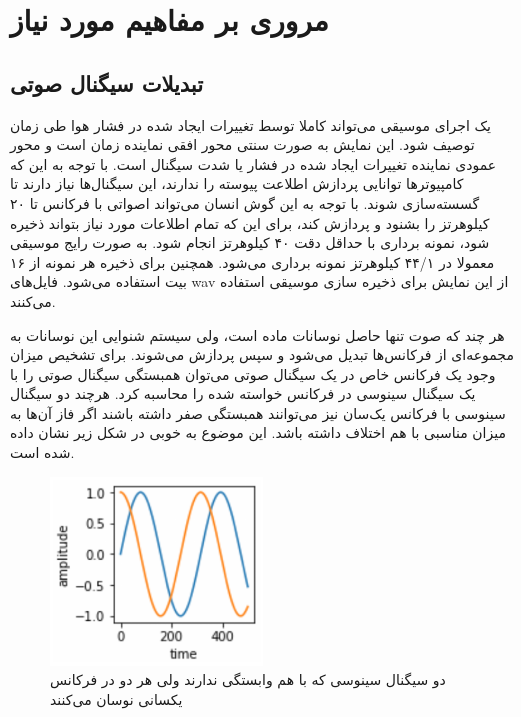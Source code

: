 \chapter{مروری بر مفاهیم مورد نیاز}
\section{تبدیلات سیگنال صوتی}
یک اجرای موسیقی می‌تواند کاملا توسط تغییرات ایجاد شده در فشار هوا طی زمان توصیف
شود. این نمایش به صورت سنتی محور افقی نماینده زمان است و محور عمودی نماینده
تغییرات ایجاد شده در فشار یا شدت سیگنال است. با توجه به این که کامپیوترها
توانایی پردازش اطلاعت پیوسته را ندارند، این سیگنال‌ها نیاز دارند تا گسسته‌سازی
شوند. با توجه به این گوش انسان می‌تواند اصواتی با فرکانس تا ۲۰ کیلوهرتز را بشنود
و پردازش کند، برای این که تمام اطلاعات مورد نیاز بتواند ذخیره شود، نمونه برداری
با حداقل دقت ۴۰ کیلوهرتز انجام شود. به صورت رایج موسیقی معمولا در ۴۴/۱ کیلوهرتز
نمونه برداری می‌شود. همچنین برای ذخیره هر نمونه از ۱۶ بیت استفاده می‌شود.
فایل‌های wav از این نمایش برای ذخیره سازی موسیقی استفاده می‌کنند.

هر چند که صوت تنها حاصل نوسانات ماده است، ولی سیستم شنوایی این نوسانات به
مجموعه‌ای از فرکانس‌ها تبدیل می‌شود و سپس پردازش می‌شوند. برای تشخیص میزان وجود
یک فرکانس خاص در یک سیگنال صوتی می‌توان همبستگی سیگنال صوتی را با یک سیگنال
سینوسی در فرکانس خواسته شده را محاسبه کرد. هرچند دو سیگنال سینوسی با فرکانس
یک‌سان نیز می‌توانند همبستگی صفر داشته باشند اگر فاز آن‌ها به میزان مناسبی با هم
اختلاف داشته باشد. این موضوع به خوبی در شکل زیر نشان داده شده است.
\begin{figure}[ht]
    \centering
    \includegraphics[height=5cm]{./statics/uncorrelated_sine_waves.png}
    \caption{دو سیگنال سینوسی که با هم وابستگی ندارند ولی هر دو در فرکانس یکسانی نوسان می‌کنند}
\end{figure}

